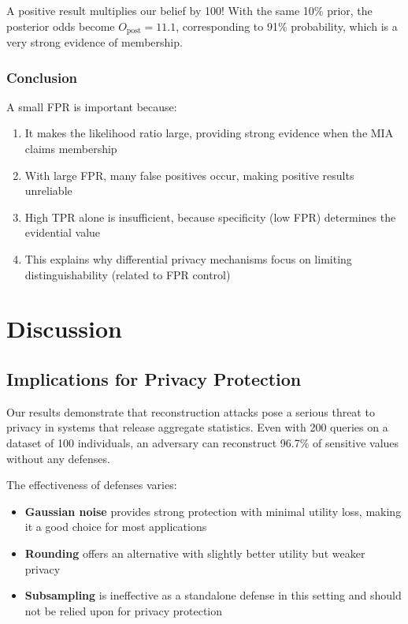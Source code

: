 \documentclass[11pt,letterpaper]{article}
\begin{document}
A positive result multiplies our belief by 100! With the same 10\% prior, the posterior odds become $O_{\text{post}} = 11.1$, corresponding to 91\% probability, which is a very strong evidence of membership.

\subsubsection{Conclusion}

A small FPR is important because:

\begin{enumerate}[leftmargin=*]
    \item It makes the likelihood ratio large, providing strong evidence when the MIA claims membership
    \item With large FPR, many false positives occur, making positive results unreliable
    \item High TPR alone is insufficient, because specificity (low FPR) determines the evidential value
    \item This explains why differential privacy mechanisms focus on limiting distinguishability (related to FPR control)
\end{enumerate}

\section{Discussion}

\subsection{Implications for Privacy Protection}

Our results demonstrate that reconstruction attacks pose a serious threat to privacy in systems that release aggregate statistics. Even with 200 queries on a dataset of 100 individuals, an adversary can reconstruct 96.7\% of sensitive values without any defenses.

The effectiveness of defenses varies:

\begin{itemize}[leftmargin=*]
    \item \textbf{Gaussian noise} provides strong protection with minimal utility loss, making it a good choice for most applications
    \item \textbf{Rounding} offers an alternative with slightly better utility but weaker privacy
    \item \textbf{Subsampling} is ineffective as a standalone defense in this setting and should not be relied upon for privacy protection
\end{itemize}
\end{document}

